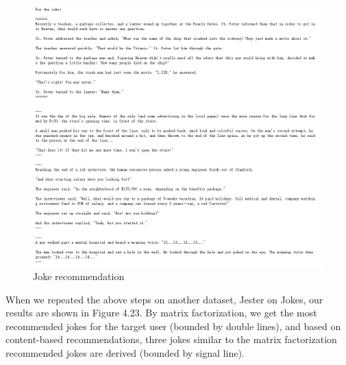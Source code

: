 \begin{figure}[htbp]
\centering
\includegraphics[scale =0.47]{figure/h5.png}
\caption{Joke recommendation}
\end{figure}

When we repeated the above steps on another dataset, Jester on Jokes, our results are shown in Figure 4.23. By matrix factorization, we get the most recommended jokes for the target user (bounded by double lines), and based on content-based recommendations, three jokes similar to the matrix factorization recommended jokes are derived (bounded by signal line).